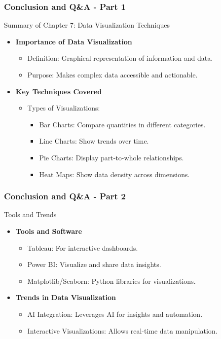 \documentclass[aspectratio=169]{beamer}
\begin{document}
\begin{frame}[fragile]
    \frametitle{Conclusion and Q\&A - Part 1}
    \begin{block}{Summary of Chapter 7: Data Visualization Techniques}
        \begin{itemize}
            \item \textbf{Importance of Data Visualization}
            \begin{itemize}
                \item Definition: Graphical representation of information and data.
                \item Purpose: Makes complex data accessible and actionable.
            \end{itemize}
            \item \textbf{Key Techniques Covered}
            \begin{itemize}
                \item Types of Visualizations:
                \begin{itemize}
                    \item Bar Charts: Compare quantities in different categories.
                    \item Line Charts: Show trends over time.
                    \item Pie Charts: Display part-to-whole relationships.
                    \item Heat Maps: Show data density across dimensions.
                \end{itemize}
            \end{itemize}
        \end{itemize}
    \end{block}
\end{frame}

\begin{frame}[fragile]
    \frametitle{Conclusion and Q\&A - Part 2}
    \begin{block}{Tools and Trends}
        \begin{itemize}
            \item \textbf{Tools and Software}
            \begin{itemize}
                \item Tableau: For interactive dashboards.
                \item Power BI: Visualize and share data insights.
                \item Matplotlib/Seaborn: Python libraries for visualizations.
            \end{itemize}
            \item \textbf{Trends in Data Visualization}
            \begin{itemize}
                \item AI Integration: Leverages AI for insights and automation.
                \item Interactive Visualizations: Allows real-time data manipulation.
            \end{itemize}
        \end{itemize}
    \end{block}
\end{frame}
\end{document}
